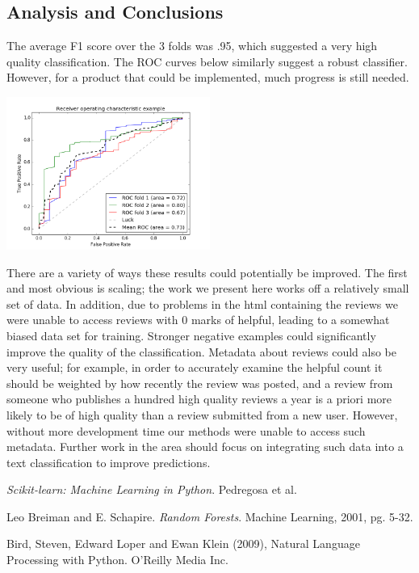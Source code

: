 \documentclass{article}
\newenvironment{Figure}
	{\par\medskip\noindent}
	{\par\medskip}
\begin{document}
\begin{multicols}{2}
\section{Analysis and Conclusions}
The average F1 score over the 3 folds was .95, which suggested a very high quality classification. The ROC curves below similarly suggest a robust classifier. However, for a product that could be implemented, much progress is still needed.
\begin{Figure}
	\includegraphics[width=0.5\textwidth]{ROC}
\end{Figure}

There are a variety of ways these results could potentially be improved. The first and most obvious is scaling; the work we present here works off a relatively small set of data. In addition, due to problems in the html containing the reviews we were unable to access reviews with 0 marks of helpful, leading to a somewhat biased data set for training. Stronger negative examples could significantly improve the quality of the classification. Metadata about reviews could also be very useful; for example, in order to accurately examine the helpful count it should be weighted by how recently the review was posted, and a review from someone who publishes a hundred high quality reviews a year is a priori more likely to be of high quality than a review submitted from a new user. However, without more development time our methods were unable to access such metadata. Further work in the area should focus on integrating such data into a text classification to improve predictions.
\end{multicols}

\begin{thebibliography}{9}
	 \textit{Scikit-learn: Machine Learning in Python}. Pedregosa et al.
	
	 Leo Breiman and E. Schapire. \textit{Random Forests}. Machine Learning, 2001, pg. 5-32.
	
	 Bird, Steven, Edward Loper and Ewan Klein (2009), Natural Language Processing with Python. O’Reilly Media Inc.
\end{thebibliography}
\end{document}

